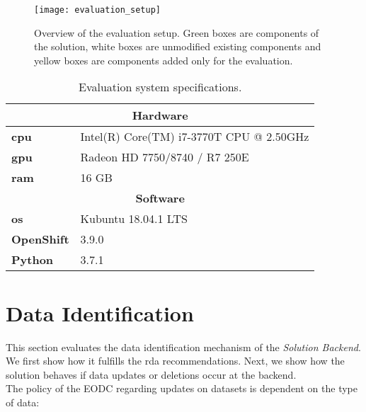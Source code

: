 \documentclass[draft,final]{vutinfth} %
\begin{document}
\begin{figure}[h]
	\centering
	\texttt{[image: evaluation\_setup]}
	\caption{Overview of the evaluation setup. Green boxes are components of the solution, white boxes are unmodified existing components and yellow boxes are components added only for the evaluation.}
	\label{fig:evaluation_setup} %
\end{figure}

\begin{table}[]
	\caption{Evaluation system specifications.}
	\centering
	\begin{tabular}{l|l}
		\multicolumn{2}{c}{\textbf{Hardware}} \\ \hline
		\textbf{\acrshort{cpu}} & Intel(R) Core(TM) i7-3770T CPU @ 2.50GHz \\ 
		\textbf{\acrshort{gpu}} & Radeon HD 7750/8740 / R7 250E  \\ 
		\textbf{\acrshort{ram}} & 16 GB  \\ 
		\multicolumn{2}{c}{\textbf{Software}} \\ \hline
		\textbf{\acrshort{os}} & Kubuntu 18.04.1 LTS \\ 
		\textbf{OpenShift} & 3.9.0  \\ 
		\textbf{Python} & 3.7.1  \\ 
	\end{tabular}
	\label{Tab:eva_hardware}
\end{table}
 

\section{Data Identification}\label{Evaluation:special_dataid}
This section evaluates the data identification mechanism of the \textit{Solution Backend}. We first show how it fulfills the \acrshort{rda} recommendations. Next, we  show how the solution behaves if data updates or deletions occur at the backend.\\  
The policy of the EODC regarding updates on datasets is dependent on the type of data:
\end{document}
